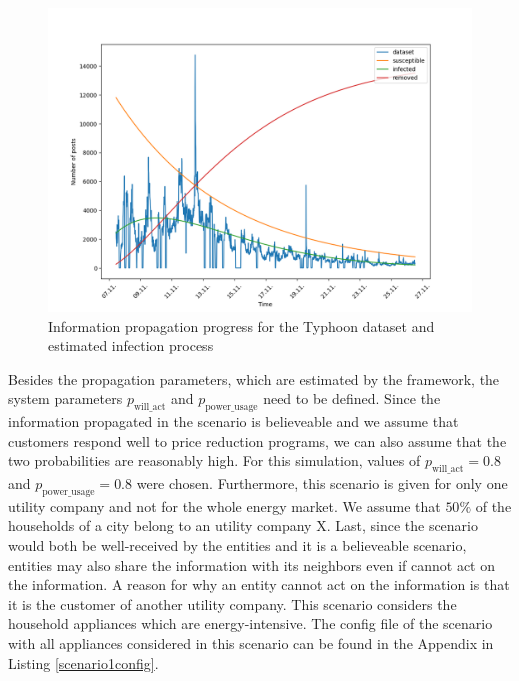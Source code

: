 \begin{figure}[!ht]
    \center
    \includegraphics[scale=.7]{figs/parameter_estimation.png}
    \caption{Information propagation progress for the Typhoon dataset 
    and estimated infection process}
    \label{propagationestimationtyphoon}
\end{figure}

Besides the propagation parameters, which are estimated by the framework,
the system parameters $p_{\mathrm{will\_act}}$ and 
$p_{\mathrm{power\_usage}}$ need to be defined. Since the information 
propagated in the scenario
is believeable and we assume that customers respond well to price 
reduction programs, we can also assume that the two probabilities are 
reasonably high. For this simulation, values of $p_{\mathrm{will\_act}}=0.8$ and 
$p_{\mathrm{power\_usage}}=0.8$ were chosen. Furthermore, this scenario
is given for only one utility company and not for the whole 
energy market. We assume that $50\%$ of the households of a city belong
to an utility company X. Last, since the scenario would both be 
well-received by the entities and it is a believeable scenario, 
entities may also share the information with its neighbors even if
cannot act on the information. A reason for why an entity cannot act 
on the information is that it is the customer of another utility company.
This scenario considers the household appliances which are energy-intensive.
The config file of the scenario with all appliances considered in this
scenario can be found in the Appendix in Listing \ref{scenario1config}.


